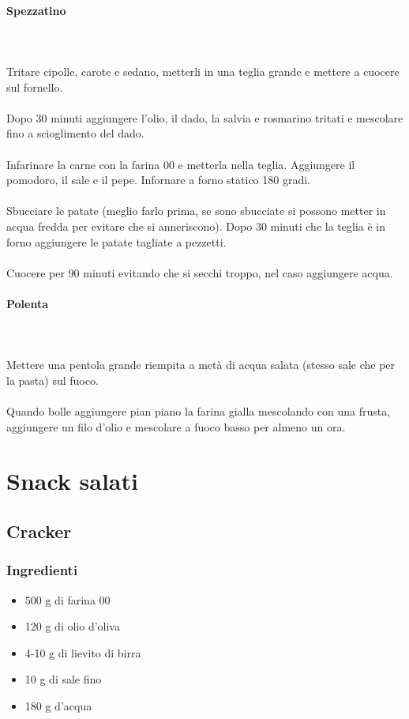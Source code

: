 \documentclass[12pt, a4paper]{article}
\begin{document}
	\paragraph{Spezzatino}\mbox{}\\\\ %
	Tritare cipolle, carote e sedano, metterli in una teglia grande
	e mettere a cuocere sul fornello.\\\\
	Dopo 30 minuti aggiungere l'olio, il dado, la salvia e rosmarino
	tritati e mescolare fino a scioglimento del dado.\\\\
	Infarinare la carne con la farina 00 e metterla nella teglia.
	Aggiungere il pomodoro, il sale e il pepe.
	Infornare a forno statico 180 gradi.\\\\
	Sbucciare le patate (meglio farlo prima, se sono sbucciate si
	possono metter in acqua fredda per evitare che si anneriscono).
	Dopo 30 minuti che la teglia è in forno aggiungere le patate
	tagliate a pezzetti.\\\\
	Cuocere per 90 minuti evitando che si secchi troppo, nel caso
	aggiungere acqua.
	\paragraph{Polenta}\mbox{}\\\\
	Mettere una pentola grande riempita
	a metà di acqua salata (stesso sale che per la pasta) sul fuoco.\\\\
	Quando bolle aggiungere pian piano la farina gialla mescolando
	con una frusta, aggiungere un filo d'olio e mescolare a fuoco
	basso per almeno un ora.
\clearpage

\section{Snack salati}

\subsection{Cracker}

\subsubsection{Ingredienti}
\begin{itemize}
\item	500 g di farina 00
\item	120 g di olio d'oliva
\item	4-10 g di lievito di birra
\item	10 g di sale fino
\item	180 g d'acqua
\end{itemize}
\end{document}
